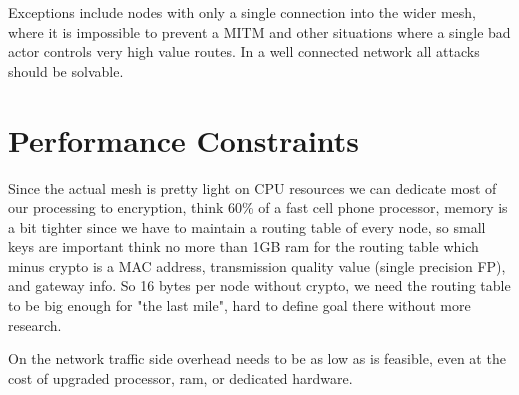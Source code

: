 \documentclass[11pt]{article}
\begin{document}
Exceptions include nodes with only a single connection into the wider mesh, where it is impossible to prevent a MITM and other situations where a single bad actor controls very high value routes. In a well connected network all attacks should be solvable. 

\section{Performance Constraints}

Since the actual mesh is pretty light on CPU resources we can dedicate most of our processing to encryption, think 60\% of a fast cell phone processor, memory is a bit tighter since we have to maintain a routing table of every node, so small keys are important think no more than 1GB ram for the routing table which minus crypto is a MAC address, transmission quality value (single precision FP), and gateway info. So 16 bytes per node without crypto, we need the routing table to be big enough for "the last mile", hard to define goal there without more research. 

On the network traffic side overhead needs to be as low as is feasible, even at the cost of upgraded processor, ram, or dedicated hardware. 
\end{document}
